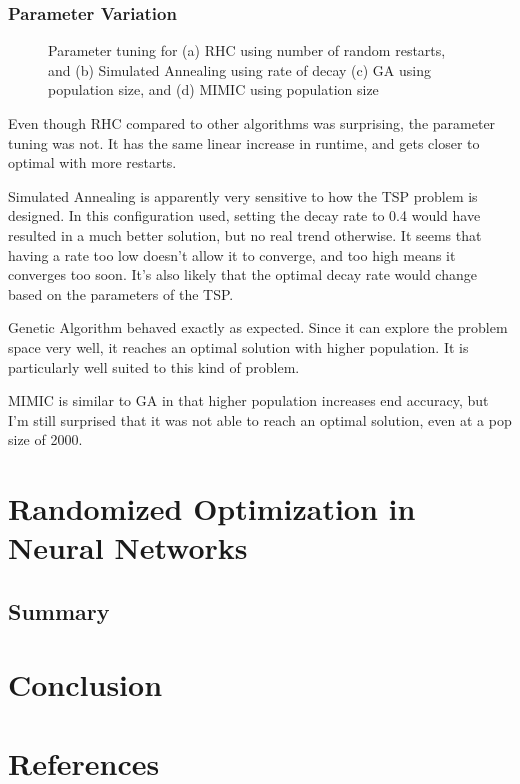 \documentclass[
	letterpaper, %
]{mlreport}
\begin{document}
\subsubsection{Parameter Variation}
\begin{figure}
	\centering
	\caption{Parameter tuning for (a) RHC using number of random restarts, and (b) Simulated Annealing using rate of decay (c) GA using population size, and (d) MIMIC using population size}
	\label{fig:fig6}
\end{figure}
Even though RHC compared to other algorithms was surprising, the parameter tuning was not. It has the same linear increase in runtime, and gets closer to optimal with more restarts.

Simulated Annealing is apparently very sensitive to how the TSP problem is designed. In this configuration used, setting the decay rate to 0.4 would have resulted in a much better solution, but no real trend otherwise. It seems that having a rate too low doesn't allow it to converge, and too high means it converges too soon. It's also likely that the optimal decay rate would change based on the parameters of the TSP.

Genetic Algorithm behaved exactly as expected. Since it can explore the problem space very well, it reaches an optimal solution with higher population. It is particularly well suited to this kind of problem.

MIMIC is similar to GA in that higher population increases end accuracy, but I'm still surprised that it was not able to reach an optimal solution, even at a pop size of 2000.

\section{Randomized Optimization in Neural Networks}
\subsection{Summary}


\section{Conclusion}

\newpage

\section{References}
\nocite{Hayes19}
\nocite{Mitchell}
\nocite{Rollings20}
\printbibliography
\end{document}
